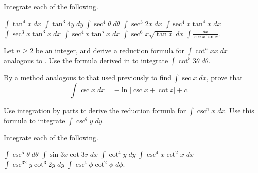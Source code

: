 \begin{exercises}
Integrate each of the following.
\begin{exenum}
\x
$\int \tan^4 x \; dx$
\x
$\int \tan^3 4y \; dy$
\x
$\int \sec^4\theta \; d\theta$
\x
$\int \sec^3 2x \; dx$
\x
$\int \sec^4x \tan^4x \; dx$
\x
$\int \sec^3x \tan^3x \; dx$
\x
$\int \sec^4x \tan^5x \; dx$
\x
$\int \sec^6x \sqrt{\tan x} \; dx$
\x
$\int \frac{dx}{\sec x \tan x}$.
\end{exenum}

\begin{exenum}
\x
{}
Let $n \geq 2$ be an integer, and derive
a reduction formula for
$\int \cot^nx x \; dx$
analogous to .
\x
Use the formula derived in 
to integrate $\int \cot^5 3\theta \; d\theta$.
\end{exenum}

By a method analogous to that used previously
to find $\int \sec x \; dx$, prove that
\[
\int \csc x \; dx = -\ln|\csc x + \cot x| + c
.
\]

\begin{exenum}
\x
Use integration by parts to derive the reduction formula
 for $\int \csc^nx \; dx$.
\x
Use this formula to integrate
$\int \csc^6y \; dy$.
\end{exenum}

Integrate each of the following.
\begin{exenum}
\x
$\int \csc^5\theta \; d\theta$
\x
$\int \sin 3x \cot 3x \; dx$
\x
$\int \cot^4y \; dy$
\x
$\int \csc^4x \cot^2x \; dx$
\x
$\int \csc^32y \cot^3 2y \; dy$
\x
$\int \csc^3\phi \cot^2\phi \; d\phi$.
\end{exenum}

\end{exercises}
